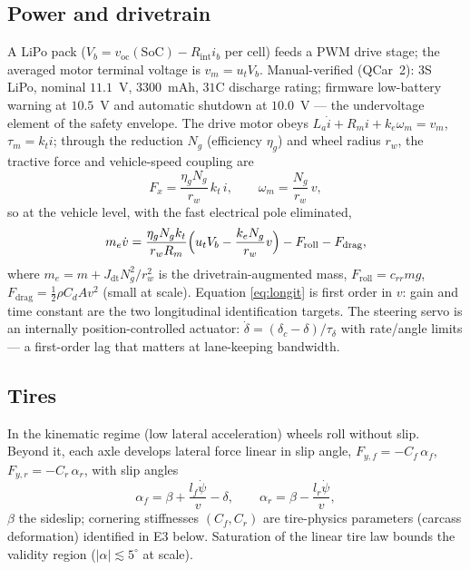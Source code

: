 \documentclass[conference]{IEEEtran}
\begin{document}
\subsection{Power and drivetrain}
A LiPo pack ($V_b = v_{\mathrm{oc}}(\mathrm{SoC}) - R_{\mathrm{int}} i_b$ per cell) feeds a PWM drive stage; the averaged motor terminal voltage is $v_m = u_t V_b$. Manual-verified (QCar~2): 3S LiPo, nominal $11.1$~V, $3300$~mAh, $31$C discharge rating; firmware low-battery warning at $10.5$~V and automatic shutdown at $10.0$~V --- the undervoltage element of the safety envelope. The drive motor obeys $L_a\dot i + R_m i + k_e\omega_m = v_m$, $\tau_m = k_t i$; through the reduction $N_g$ (efficiency $\eta_g$) and wheel radius $r_w$, the tractive force and vehicle-speed coupling are
\begin{equation}
F_x = \frac{\eta_g N_g}{r_w}\,k_t\,i,
\qquad
\omega_m = \frac{N_g}{r_w}\,v ,
\end{equation}
so at the vehicle level, with the fast electrical pole eliminated,
\begin{equation}
m_e\dot v = \frac{\eta_g N_g k_t}{r_w R_m}\Bigl(u_t V_b - \frac{k_e N_g}{r_w}v\Bigr) - F_{\mathrm{roll}} - F_{\mathrm{drag}},
\label{eq:longit}
\end{equation}
where $m_e = m + J_{\mathrm{dt}}N_g^2/r_w^2$ is the drivetrain-augmented mass, $F_{\mathrm{roll}} = c_{rr} m g$, $F_{\mathrm{drag}} = \tfrac12\rho C_d A v^2$ (small at scale). Equation \eqref{eq:longit} is first order in $v$: gain and time constant are the two longitudinal identification targets. The steering servo is an internally position-controlled actuator: $\dot\delta = (\delta_c - \delta)/\tau_\delta$ with rate/angle limits --- a first-order lag that matters at lane-keeping bandwidth.

\subsection{Tires}
In the kinematic regime (low lateral acceleration) wheels roll without slip. Beyond it, each axle develops lateral force linear in slip angle, $F_{y,f} = -C_f\,\alpha_f$, $F_{y,r} = -C_r\,\alpha_r$, with slip angles
\begin{equation}
\alpha_f = \beta + \frac{l_f\dot\psi}{v} - \delta,\qquad
\alpha_r = \beta - \frac{l_r\dot\psi}{v},
\end{equation}
$\beta$ the sideslip; cornering stiffnesses $(C_f, C_r)$ are tire-physics parameters (carcass deformation) identified in E3 below. Saturation of the linear tire law bounds the validity region ($|\alpha| \lesssim 5^\circ$ at scale).
\end{document}
